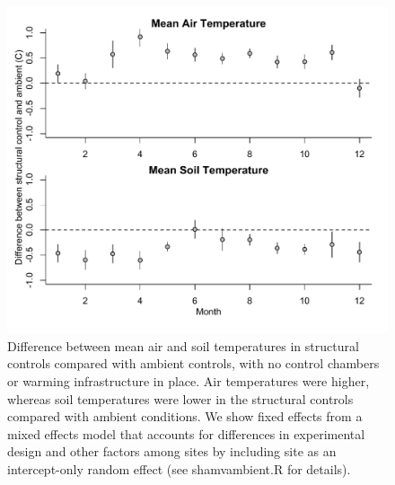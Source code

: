 \documentclass{article}
\begin{document}
 \begin{figure}[p]
     \centering
 \includegraphics{figures/ShamVSAmbient_mean.pdf}    
 \caption{Difference between mean air and soil temperatures in structural controls compared with ambient controls, with no control chambers or warming infrastructure in place. Air temperatures were higher, whereas soil temperatures were lower in the structural controls compared with ambient conditions. We show fixed effects from a mixed effects model that accounts for differences in experimental design and other factors among sites by including site as an intercept-only random effect (see shamvambient.R for details). }
 \end{figure}
\end{document}
